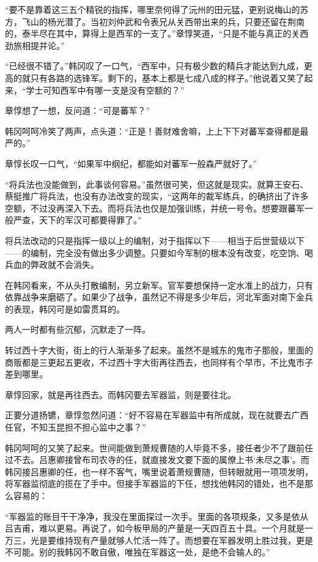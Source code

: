 “要不是靠着这三五个精锐的指挥，哪里奈何得了沅州的田元猛，更别说梅山的苏方，飞山的杨光潜了。当初刘仲武和令表兄从关西带出来的兵，只要还留在荆南的，泰半尽在其中，算得上是西军的一支了。”章惇笑道，“只是不能与真正的关西劲旅相提并论。”

“已经很不错了。”韩冈叹了一口气，“西军中，只有极少数的精兵才能达到九成，更高的就只有各路的选锋军。剩下的，基本上都是七成八成的样子。”他说着又笑了起来，“学士可知西军中有哪一支是没有空额的？”

章惇想了一想，反问道：“可是蕃军？”

韩冈呵呵冷笑了两声，点头道：“正是！善财难舍嘛，上上下下对蕃军查得都是最严的。”

章惇长叹一口气，“如果军中纲纪，都能如对蕃军一般森严就好了。”

“将兵法也没能做到，此事谈何容易。”虽然很可笑，但这就是现实。就算王安石、蔡挺推广将兵法，也没有办法改变的现实，“这两年的裁军练兵，的确挤出了许多空额，不过没再深入下去。而将兵法也仅是加强训练，并统一号令。想要跟蕃军一般严查，天下的军汉可都要得罪了。”

将兵法改动的只是指挥一级以上的编制，对于指挥以下——相当于后世营级以下——的编制，完全没有做出多少调整。只要如今军制的根本没有改变，吃空饷、喝兵血的弊政就不会消失。

在韩冈看来，不从头打散编制，另立新军。官军要想保持一定水准上的战力，只有依靠战争来磨砺了。如果少了战争，虽然记不得是多少年后，河北军面对南下金兵的表现，韩冈可是如雷贯耳的。

两人一时都有些沉郁，沉默走了一阵。

转过西十字大街，街上的行人渐渐多了起来。虽然不是城东的鬼市子那般，里面的商贩都是三更起五更收，不过西十字大街再往西去，也同样有个早市，不比鬼市子差到哪里。

章惇回家，就是再往西去。而韩冈要去军器监，则是要往北。

正要分道扬镳，章惇忽然问道：“好不容易在军器监中有所成就，现在就要去广西任官，不知玉昆担不担心监中之事？”

韩冈呵呵的又笑了起来。世间能做到萧规曹随的人毕竟不多，接任者少不了跟前任过不去。吕惠卿接曾布司农寺的任，就直接发文要下面的属僚上书‘未尽之事’。而韩冈接吕惠卿的任，也一样不客气，嘴里说着萧规曹随，但转眼就用一项项发明，将军器监彻底的揽在了手中。但接手军器监的下任，想找他韩冈的错处，也不是那么容易的：

“军器监的账目干干净净，我没在里面探过一次手。里面的各项规条，又多是依从吕吉甫，难以更易。再说了，如今板甲局的产量是一天四百五十具。一个月就是一万三，光是要维持现有产量就够人忙活一阵了。而想要在军器发明上胜过我，更是不可能。别的我韩冈不敢自傲，唯独在军器这一处，是绝不会输人的。”

